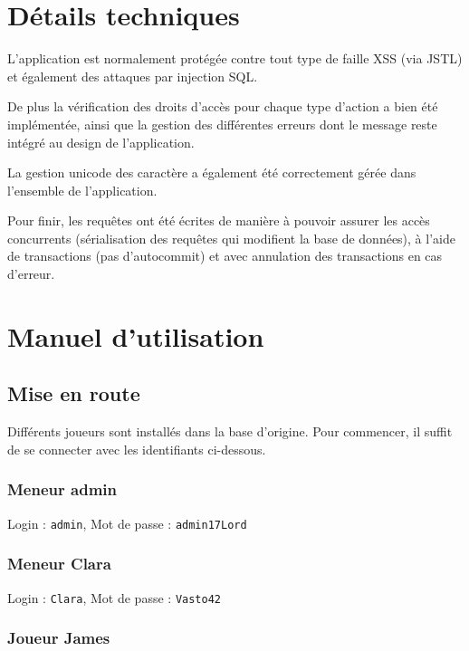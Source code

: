 \documentclass[a4paper, 11pt, titlepage]{article}
\begin{document}
\section {Détails techniques}

L'application est normalement protégée contre tout type de faille XSS (via JSTL) et également des attaques par injection SQL.

De plus la vérification des droits d'accès pour chaque type d'action a bien été implémentée, ainsi que la gestion des différentes erreurs dont le message reste intégré au design de l'application.

La gestion unicode des caractère a également été correctement gérée dans l'ensemble de l'application.

Pour finir, les requêtes ont été écrites de manière à pouvoir assurer les accès concurrents (sérialisation des requêtes qui modifient la base de données), à l'aide de transactions (pas d'autocommit) et avec annulation des transactions en cas d'erreur.




\section {Manuel d'utilisation}

\subsection {Mise en route}

Différents joueurs sont installés dans la base d'origine.
Pour commencer, il suffit de se connecter avec les identifiants ci-dessous.

\subsubsection {Meneur admin}

Login : \lstinline!admin!, Mot de passe : \lstinline!admin17Lord!


\subsubsection {Meneur Clara}

Login : \lstinline!Clara!, Mot de passe : \lstinline!Vasto42!


\subsubsection {Joueur James}
\end{document}
